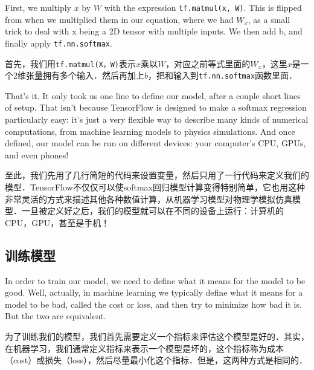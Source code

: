 First, we multiply $x$ by $W$ with the expression \lstinline{tf.matmul(x, W)}. This is flipped from when we multiplied them in our equation, where we had $W_x$, as a small trick to deal with x being a 2D tensor with multiple inputs. We then add b, and finally apply \lstinline{tf.nn.softmax}.

首先，我们用\lstinline{tf.matmul(X，W)}表示$x$乘以$W$，对应之前等式里面的$W_x$，这里$x$是一个2维张量拥有多个输入．然后再加上$b$，把和输入到\lstinline{tf.nn.softmax}函数里面．

That's it. It only took us one line to define our model, after a couple short lines of setup. That isn't because TensorFlow is designed to make a softmax regression particularly easy: it's just a very flexible way to describe many kinds of numerical computations, from machine learning models to physics simulations. And once defined, our model can be run on different devices: your computer's CPU, GPUs, and even phones!

至此，我们先用了几行简短的代码来设置变量，然后只用了一行代码来定义我们的模型．TensorFlow不仅仅可以使softmax回归模型计算变得特别简单，它也用这种非常灵活的方式来描述其他各种数值计算，从机器学习模型对物理学模拟仿真模型．一旦被定义好之后，我们的模型就可以在不同的设备上运行：计算机的CPU，GPU，甚至是手机！

\subsection{训练模型}

In order to train our model, we need to define what it means for the model to be good. Well, actually, in machine learning we typically define what it means for a model to be bad, called the cost or loss, and then try to minimize how bad it is. But the two are equivalent.

为了训练我们的模型，我们首先需要定义一个指标来评估这个模型是好的．其实，在机器学习，我们通常定义指标来表示一个模型是坏的，这个指标称为成本（cost）或损失（loss），然后尽量最小化这个指标．但是，这两种方式是相同的．


